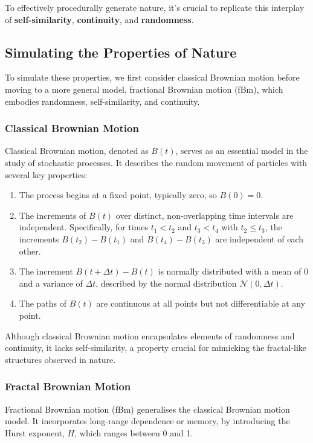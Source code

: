 To effectively procedurally generate nature, it's crucial to replicate this interplay of \textbf{self-similarity}, \textbf{continuity}, and \textbf{randomness}.

\subsection{Simulating the Properties of Nature}

To simulate these properties, we first consider classical Brownian motion before moving to a more general model, fractional Brownian motion (fBm), which embodies randomness, self-similarity, and continuity.

\subsubsection{Classical Brownian Motion}

Classical Brownian motion, denoted as $B(t)$, serves as an essential model in the study of stochastic processes. It describes the random movement of particles with several key properties:

\begin{enumerate}
    \item The process begins at a fixed point, typically zero, so $B(0) = 0$.
    \item  The increments of $B(t)$ over distinct, non-overlapping time intervals are independent. Specifically, for times $t_1 < t_2$ and $t_3 < t_4$ with $t_2 \leq t_3$, the increments $B(t_2) - B(t_1)$ and $B(t_4) - B(t_3)$ are independent of each other.
    \item The increment $B(t + \Delta t) - B(t)$ is normally distributed with a mean of 0 and a variance of $\Delta t$, described by the normal distribution $\mathcal{N}(0, \Delta t)$.
    \item The paths of $B(t)$ are continuous at all points but not differentiable at any point.
\end{enumerate}

Although classical Brownian motion encapsulates elements of randomness and continuity, it lacks self-similarity, a property crucial for mimicking the fractal-like structures observed in nature. 

\subsubsection{Fractal Brownian Motion}

Fractional Brownian motion (fBm) generalises the classical Brownian motion model. It incorporates long-range dependence or memory,  by introducing the Hurst exponent, $H$, which ranges between 0 and 1. 

